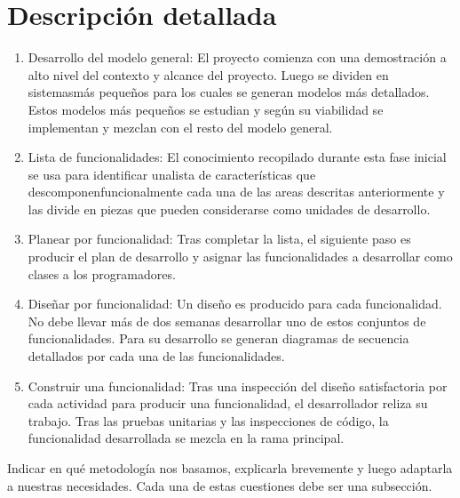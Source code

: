 \section{Descripción detallada}
\begin{enumerate}
		\item Desarrollo del modelo general: 
			El proyecto comienza con una demostración a alto nivel del contexto y alcance del proyecto. Luego se dividen en sistemasmás pequeños para los cuales se generan modelos más detallados. Estos modelos más pequeños se estudian y según su viabilidad se implementan y mezclan con el resto del modelo general.
		\item Lista de funcionalidades:
			El conocimiento recopilado durante esta fase inicial se usa para identificar unalista de características que descomponenfuncionalmente cada una de las areas descritas anteriormente y las divide en piezas que pueden considerarse como unidades de desarrollo.
		\item Planear por funcionalidad:
			Tras completar la lista, el siguiente paso es producir el plan de desarrollo y asignar las funcionalidades a desarrollar como clases a los programadores.
		\item Diseñar por funcionalidad:
			Un diseño es producido para cada funcionalidad. No debe llevar más de dos semanas desarrollar uno de estos conjuntos de funcionalidades. Para su desarrollo se generan diagramas de secuencia detallados por cada una de las funcionalidades.
		\item Construir una funcionalidad:
			Tras una inspección del diseño satisfactoria por cada actividad para producir una funcionalidad, el desarrollador reliza su trabajo. Tras las pruebas unitarias y las inspecciones de código, la funcionalidad desarrollada se mezcla en la rama principal.
\end{enumerate}




Indicar en qué metodología nos basamos, explicarla brevemente y luego adaptarla a nuestras necesidades. Cada una de estas cuestiones debe ser una subsección.
